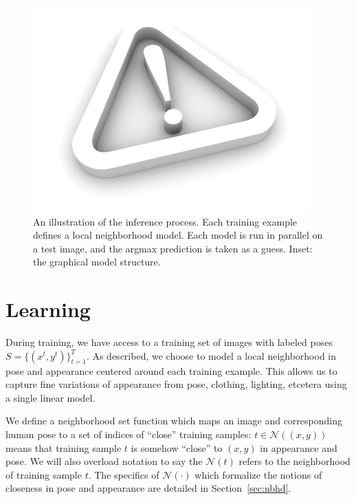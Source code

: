 \begin{figure}[tb!]
\centering
\includegraphics[width=0.99\linewidth]{figs/empty.jpg}
\caption{\label{fig:inference} An illustration of the inference process.  Each 
training example defines a local neighborhood model.  Each model is run in 
parallel on a test image, and the argmax prediction is taken as a guess. Inset: 
the graphical model structure.}
\end{figure}

\section{Learning}\label{sec:learning}

During training, we have access to a training set of images with labeled poses $S = \{(x^{t},y^{t})\}_{t=1}^T$.  As described, we choose to model a local neighborhood in pose and appearance centered around each training example.  This allows us to capture fine variations of appearance from pose, clothing, lighting, etcetera using a single linear model.

We define a neighborhood set function which maps an image and corresponding human pose to a set of indices of ``close'' training samples: $t \in \mathcal{N}((x,y))$ means that training sample $t$ is somehow ``close'' to $(x,y)$ in appearance and pose.  We will also overload notation to say the $\mathcal{N}(t)$ refers to the neighborhood of training sample $t$.  The specifics of $\mathcal{N}(\cdot)$ which formalize the notions of closeness in pose and appearance are detailed in Section~\ref{sec:nbhd}.

